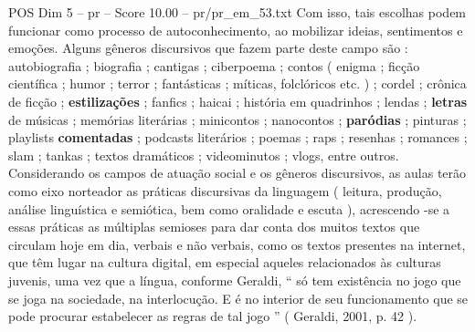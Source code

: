 \begin{textsample}{POS Dim 5 – pr – Score 10.00 – pr/pr\_em\_53.txt}
Com isso, tais escolhas podem funcionar como processo de autoconhecimento, ao mobilizar ideias, sentimentos e emoções.
Alguns gêneros discursivos que fazem parte deste campo são : autobiografia ; biografia ; cantigas ; ciberpoema ; contos ( enigma ; ficção científica ; humor ; terror ; fantásticas ; míticas, folclóricos etc. ) ; cordel ; crônica de ficção ; \textbf{estilizações} ; fanfics ; haicai ; história em quadrinhos ; lendas ; \textbf{letras} de músicas ; memórias literárias ; minicontos ; nanocontos ; \textbf{paródias} ; pinturas ; playlists \textbf{comentadas} ; podcasts literários ; poemas ; raps ; resenhas ; romances ; slam ; tankas ; textos dramáticos ; videominutos ; vlogs, entre outros.
Considerando os campos de atuação social e os gêneros discursivos, as aulas terão como eixo norteador as práticas discursivas da linguagem ( leitura, produção, análise linguística e semiótica, bem como oralidade e escuta ), acrescendo -se a essas práticas as múltiplas semioses para dar conta dos muitos textos que circulam hoje em dia, verbais e não verbais, como os textos presentes na internet, que têm lugar na cultura digital, em especial aqueles relacionados às culturas juvenis, uma vez que a língua, conforme Geraldi, “ só tem existência no jogo que se joga na sociedade, na interlocução.
E é no interior de seu funcionamento que se pode procurar estabelecer as regras de tal jogo ” ( Geraldi, 2001, p. 42 ).

\end{textsample}
